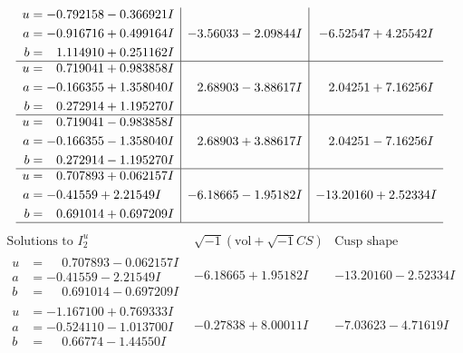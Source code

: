\documentclass[1p]{elsarticle_modified}
\theoremstyle{definition}
\newcommand{\I}{\sqrt{-1}}
\begin{document}
$$\begin{array}{c|c|c}
\begin{aligned}
u &= -0.792158 - 0.366921 I \\
a &= -0.916716 + 0.499164 I \\
b &= \phantom{-}1.114910 + 0.251162 I\end{aligned}
 & -3.56033 - 2.09844 I & -6.52547 + 4.25542 I \\ \hline\begin{aligned}
u &= \phantom{-}0.719041 + 0.983858 I \\
a &= -0.166355 + 1.358040 I \\
b &= \phantom{-}0.272914 + 1.195270 I\end{aligned}
 & \phantom{-}2.68903 - 3.88617 I & \phantom{-}2.04251 + 7.16256 I \\ \hline\begin{aligned}
u &= \phantom{-}0.719041 - 0.983858 I \\
a &= -0.166355 - 1.358040 I \\
b &= \phantom{-}0.272914 - 1.195270 I\end{aligned}
 & \phantom{-}2.68903 + 3.88617 I & \phantom{-}2.04251 - 7.16256 I \\ \hline\begin{aligned}
u &= \phantom{-}0.707893 + 0.062157 I \\
a &= -0.41559 + 2.21549 I \\
b &= \phantom{-}0.691014 + 0.697209 I\end{aligned}
 & -6.18665 - 1.95182 I & -13.20160 + 2.52334 I\\
 \hline 
 \end{array}$$\newpage$$\begin{array}{c|c|c}  
\text{Solutions to }I^u_{2}& \I (\text{vol} + \sqrt{-1}CS) & \text{Cusp shape}\\
 \hline 
\begin{aligned}
u &= \phantom{-}0.707893 - 0.062157 I \\
a &= -0.41559 - 2.21549 I \\
b &= \phantom{-}0.691014 - 0.697209 I\end{aligned}
 & -6.18665 + 1.95182 I & -13.20160 - 2.52334 I \\ \hline\begin{aligned}
u &= -1.167100 + 0.769333 I \\
a &= -0.524110 - 1.013700 I \\
b &= \phantom{-}0.66774 - 1.44550 I\end{aligned}
 & -0.27838 + 8.00011 I & -7.03623 - 4.71619 I \\ \hline\begin{aligned}

\end{aligned}
\end{array}$$
\end{document}
